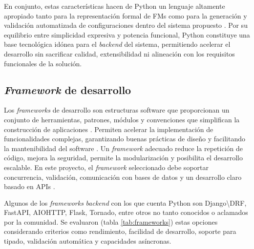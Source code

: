 En conjunto, estas características hacen de Python un lenguaje altamente apropiado 
tanto para la representación formal de \ac{FM}s como para la generación 
y validación automatizada de configuraciones dentro del sistema propuesto \citep{ray2014large}.
Por su equilibrio entre simplicidad expresiva y potencia funcional, Python constituye 
una base tecnológica idónea para el \textit{backend} del sistema, permitiendo acelerar el 
desarrollo sin sacrificar calidad, extensibilidad ni alineación con los requisitos 
funcionales de la solución.

\subsection{\textit{Framework} de desarrollo}

Los \textit{frameworks} de desarrollo son estructuras software 
que proporcionan un conjunto de herramientas, patrones, 
módulos y convenciones que simplifican la construcción de 
aplicaciones \citep{sommerville2016se}. Permiten acelerar la implementación de funcionalidades 
complejas, garantizando buenas prácticas de diseño y facilitando la 
mantenibilidad del software \citep{pressman2014se}. Un \textit{framework} adecuado reduce la repetición 
de código, mejora la seguridad, permite la modularización y posibilita el 
desarrollo escalable. En este proyecto, el \textit{framework} seleccionado debe soportar 
concurrencia, validación, comunicación con bases de datos y un desarrollo claro 
basado en \ac{API}s \citep{gamma1995design}.

Algunos de los \textit{frameworks} \textit{backend} con los que cuenta Python son 
Django\textbackslash \ac{DRF}, FastAPI, AIOHTTP, Flask, Tornado, entre otros no tanto conocidos 
o aclamados por la comunidad. Se evaluaron (tabla \ref{tab:frameworks}) estas opciones considerando 
criterios como rendimiento, facilidad de desarrollo, soporte para tipado, validación automática 
y capacidades asíncronas.

